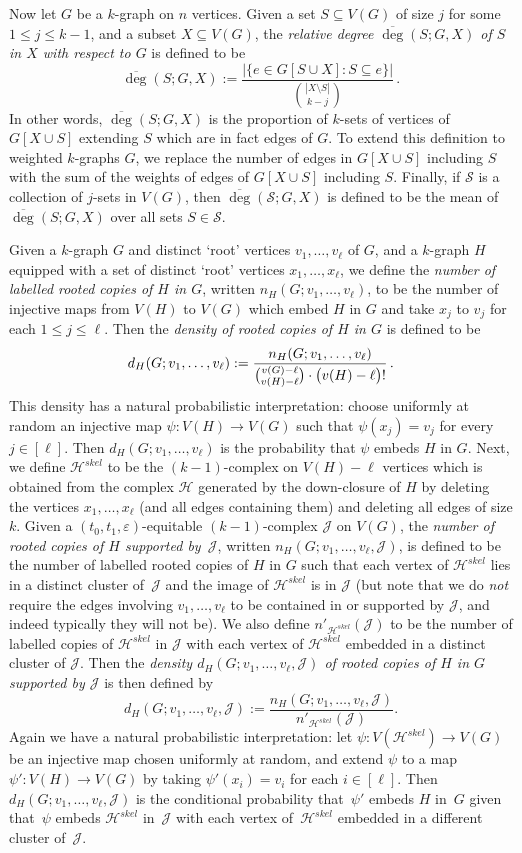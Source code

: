 \documentclass[12pt,a4paper]{amsart}
\let\subset\subseteq
\let\eps\varepsilon
\newcommand{\Hy}{\mathcal{H}}
\newcommand{\cJ}{\mathcal{J}}
\newcommand{\cS}{\mathcal{S}}
\newcommand{\reldeg}{\overline{\deg}}
\newcommand{\Hskel}{\Hy^{skel}}
\begin{document}
Now let $G$ be a $k$-graph on $n$ vertices. Given a set $S \subseteq V(G)$ of size $j$
for some $1 \le j\le k-1$, and a subset $X \subseteq V(G)$, the \emph{relative degree $\reldeg(S;G, X)$ of $S$ in $X$
with respect to $G$} is defined to be
\[\reldeg(S;G, X):=\frac{\big|\{e\in G[S \cup X] :S\subset
e\}\big|}{\binom{|X \setminus S|}{k-j}}\,.\]
In other words, $\reldeg(S;G, X)$ is the proportion of $k$-sets of vertices of $G[X \cup S]$ extending $S$ which are in fact edges of $G$.
To extend this definition to weighted $k$-graphs $G$, we replace the
number of edges in $G[X \cup S]$ including $S$ with the sum of the weights of edges of $G[X \cup S]$
including $S$. Finally, if $\cS$ is a collection of $j$-sets in $V(G)$,
then $\reldeg(\cS; G, X)$ is defined to be the mean of $\reldeg(S;G, X)$ over
all sets $S\in\cS$.

Given a $k$-graph $G$ and distinct `root' vertices
$v_1,\ldots,v_\ell$ of $G$, and a $k$-graph $H$ equipped with a set of distinct
`root' vertices $x_1,\ldots,x_\ell$, we define the \emph{number of labelled rooted copies of $H$ in $G$}, written
$n_H(G;v_1,\ldots,v_\ell)$, to be the number of injective maps from $V(H)$ to
$V(G)$ which embed $H$ in $G$ and take $x_j$ to $v_j$ for each $1\le j\le\ell$. Then the \emph{density of
rooted copies of $H$ in $G$} is defined to be
\[d_H(G;v_1,\ldots,v_\ell):=\frac{n_H(G;v_1,\ldots,v_\ell)}{\tbinom{v(G)-\ell}{v(H)-\ell}\cdot\big(v(H)-\ell\big)!}\,.\]
This density has a natural probabilistic interpretation: choose uniformly at random an injective map $\psi : V(H) \to V(G)$ such that $\psi(x_j) = v_j$ for every $j \in [\ell]$. Then $d_H(G;v_1, \dots, v_\ell)$ is the probability that $\psi$ embeds $H$ in $G$. 
Next, we define $\Hskel$ to be the $(k-1)$-complex on $V(H) - \ell$ vertices which is
obtained from the complex $\Hy$ generated by the down-closure of $H$ by deleting the vertices
$x_1,\ldots,x_\ell$ (and all edges containing them) and deleting all
edges of size $k$. Given a $(t_0, t_1, \eps)$-equitable
$(k-1)$-complex $\cJ$ on $V(G)$, the \emph{number of rooted copies of $H$ supported by~$\cJ$}, written $n_H(G;v_1,\ldots,v_\ell,\cJ)$, is defined to be the number of labelled
rooted copies of $H$ in $G$ such that each vertex of $\Hskel$ lies in a distinct cluster of~$\cJ$ and the image of $\Hskel$ is in $\cJ$ (but note that we do \emph{not} require the edges involving
$v_1,\ldots,v_\ell$ to be contained in or supported by $\cJ$, and indeed
typically they will not be). We also define $n'_{\Hskel}(\cJ)$ to be the number of labelled copies of $\Hskel$ in $\cJ$ with each vertex of $\Hskel$ embedded in a distinct cluster of $\cJ$. Then the
\emph{density $d_H(G;v_1,\ldots,v_\ell,\cJ)$ of rooted copies of $H$ in $G$ supported by $\cJ$} is then defined by
$$d_H(G;v_1,\ldots,v_\ell,\cJ):= \frac{n_H(G;v_1,\ldots,v_\ell,\cJ)}{n'_{\Hskel}(\cJ)}.$$
Again we have a natural probabilistic interpretation: let $\psi : V(\Hskel) \to V(G)$ be an injective map chosen uniformly at random, and extend $\psi$ to a map $\psi' : V(H) \to V(G)$ by taking $\psi'(x_i) = v_i$ for each $i \in [\ell]$. Then $d_H(G;v_1,\ldots,v_\ell,\cJ)$ is the conditional probability that~$\psi'$ embeds $H$ in~$G$ given that~$\psi$ embeds $\Hskel$ in~$\cJ$ with each vertex of~$\Hskel$ embedded in a different cluster of~$\cJ$. 
\end{document}
